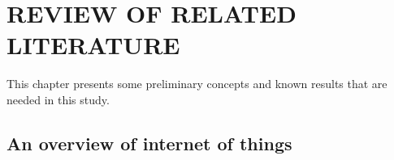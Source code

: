 \chapter{REVIEW OF RELATED LITERATURE}
{\baselineskip
This chapter presents some preliminary concepts and known results that are needed in this study.

\section{An overview of internet of things}




}